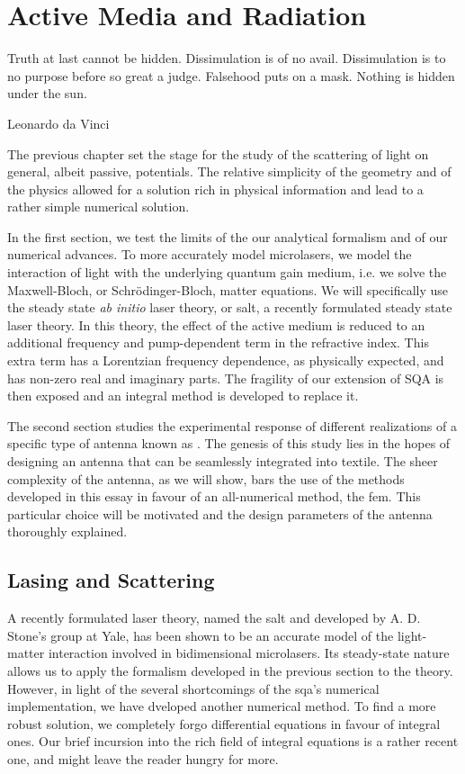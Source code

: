 \chapter{Active Media and Radiation}
\epigraph{Truth at last cannot be hidden. Dissimulation is of no avail.
Dissimulation is to no purpose before so great a judge.
Falsehood puts on a mask. Nothing is hidden under the sun.}
{Leonardo da Vinci}
The previous chapter set the stage for the study of 
the scattering of light on general, albeit passive, 
potentials. The relative simplicity of the geometry
and of the physics allowed for a solution rich 
in physical information and lead to a rather simple
numerical solution. 

In the first section, we test the limits of the our analytical formalism
and of our numerical advances. To more accurately model
microlasers, we model the interaction of light with the underlying
quantum gain medium, i.e. we solve the Maxwell-Bloch, or Schrödinger-Bloch, 
matter equations. We will specifically use the steady state \textit{ab initio}
laser theory, or \gls{salt}, a recently 
formulated steady state laser theory. In this theory, the effect 
of the active medium is reduced to an additional frequency and pump-dependent
term in the refractive index. This extra term has a Lorentzian frequency
dependence, as physically expected, and has non-zero real and imaginary
parts. The fragility of our extension of SQA is then exposed and an 
integral method is developed to replace it.

The second section studies the experimental response
of different realizations of a specific type of antenna
known as . The genesis of this study lies in
the hopes of designing an antenna that can be seamlessly
integrated into textile. The sheer complexity of the
antenna, as we will show, bars the use of the methods developed
in this essay in favour of an all-numerical method, the \gls{fem}. 
This particular choice will be motivated and the design 
parameters of the antenna thoroughly explained. 

\section{Lasing and Scattering}
A recently formulated laser theory, named the 
\gls{salt} and developed by A. D. Stone's group
at Yale, has been shown to be an accurate model 
of the light-matter interaction involved in bidimensional
microlasers. Its steady-state nature allows us to apply
the formalism developed in the previous section 
to the theory. However, in light of the several shortcomings
of the \gls{sqa}'s numerical implementation, we have dveloped another
numerical method. 
To find a more robust solution, we completely forgo 
differential equations in favour of integral ones. 
Our brief incursion into the rich field of integral equations
is a rather recent one, and might leave the reader hungry for more.

